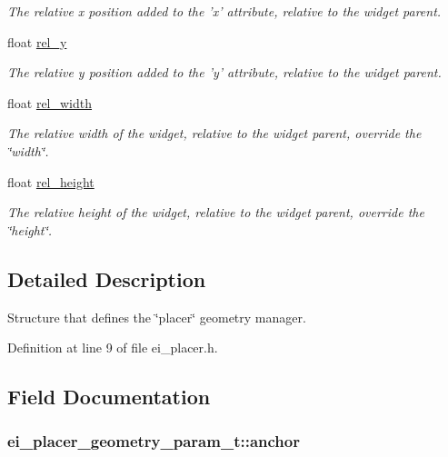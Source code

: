 \begin{DoxyCompactItemize}
\begin{DoxyCompactList}\small\item\em The relative x position added to the 'x' attribute, relative to the widget parent. \end{DoxyCompactList}\item 
float \hyperlink{structei__placer__geometry__param__t_a0cf562b8ca4f89fc1cad3295597e281f}{rel\+\_\+y}
\begin{DoxyCompactList}\small\item\em The relative y position added to the 'y' attribute, relative to the widget parent. \end{DoxyCompactList}\item 
float \hyperlink{structei__placer__geometry__param__t_a6db90e24dd410aba70d28601c4a45848}{rel\+\_\+width}
\begin{DoxyCompactList}\small\item\em The relative width of the widget, relative to the widget parent, override the \char`\"{}width\char`\"{}. \end{DoxyCompactList}\item 
float \hyperlink{structei__placer__geometry__param__t_aa2a20632f767399e71b3c4ce25ab756a}{rel\+\_\+height}
\begin{DoxyCompactList}\small\item\em The relative height of the widget, relative to the widget parent, override the \char`\"{}height\char`\"{}. \end{DoxyCompactList}\end{DoxyCompactItemize}


\subsection{Detailed Description}
Structure that defines the \char`\"{}placer\char`\"{} geometry manager. 

Definition at line 9 of file ei\+\_\+placer.\+h.



\subsection{Field Documentation}
\hypertarget{structei__placer__geometry__param__t_a6c2d76c5f9b80d1dedd8357def0d58c7}{
\subsubsection[{anchor}]{ ei\+\_\+placer\+\_\+geometry\+\_\+param\+\_\+t\+::anchor}}\label{structei__placer__geometry__param__t_a6c2d76c5f9b80d1dedd8357def0d58c7}


